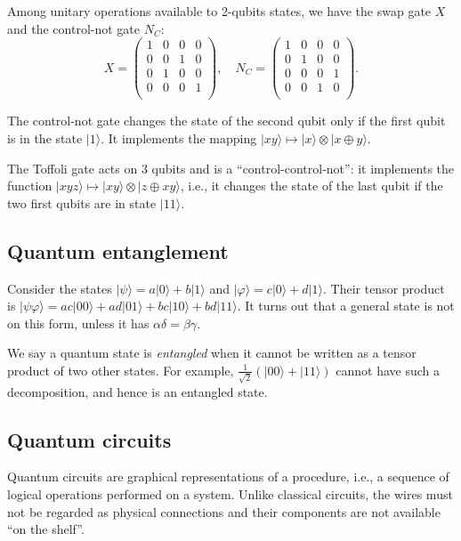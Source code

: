 \documentclass[a4paper, 10pt]{article}
\numberwithin{equation}{section}
\numberwithin{figure}{section}
\numberwithin{table}{section}
\begin{document}
Among unitary operations available to 2-qubits states, we have the swap gate $X$ and the control-not gate $N_C$:
$$ X = \begin{pmatrix}
1 & 0 & 0 & 0\\
0 & 0 & 1 & 0\\
0 & 1 & 0 & 0\\
0 & 0 & 0 & 1\\
\end{pmatrix},\quad
N_C = \begin{pmatrix}
1 & 0 & 0 & 0\\
0 & 1 & 0 & 0\\
0 & 0 & 0 & 1\\
0 & 0 & 1 & 0\\
\end{pmatrix}. $$

The control-not gate changes the state of the second qubit only if the first qubit is in the state $|1\rangle$. It implements the mapping $|xy\rangle \mapsto |x\rangle \otimes |x\oplus y\rangle$.

The Toffoli gate acts on 3 qubits and is a ``control-control-not'': it implements the function $|xyz\rangle \mapsto |xy\rangle \otimes |z\oplus xy\rangle$, i.e., it changes the state of the last qubit if the two first qubits are in state $|11\rangle$.

\subsection{Quantum entanglement}

Consider the states $|\psi\rangle = a|0\rangle + b|1\rangle$ and $|\varphi\rangle = c|0\rangle + d|1\rangle$. Their tensor product is $|\psi\varphi\rangle = ac|00\rangle + ad|01\rangle + bc|10\rangle + bd|11\rangle$. It turns out that a general state is not on this form, unless it has $\alpha\delta = \beta\gamma$.

We say a quantum state is \textit{entangled} when it cannot be written as a tensor product of two other states. For example, $\frac{1}{\sqrt{2}}(|00\rangle+|11\rangle)$ cannot have such a decomposition, and hence is an entangled state.

\subsection{Quantum circuits}

Quantum circuits are graphical representations of a procedure, i.e., a sequence of logical operations performed on a system. Unlike classical circuits, the wires must not be regarded as physical connections and their components are not available ``on the shelf''.
\end{document}
